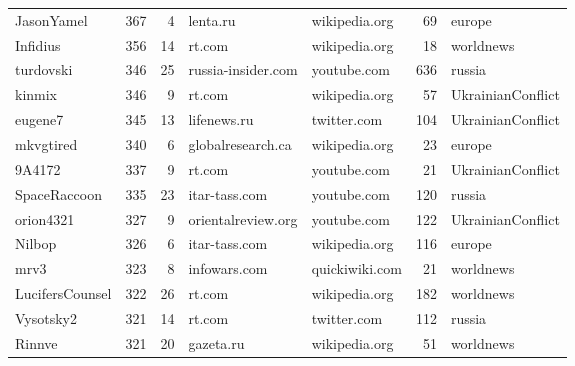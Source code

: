 \begin{tabular}{lrrllrl}
JasonYamel       &   367 &          4 &            lenta.ru &  wikipedia.org &     69 &             europe \\
Infidius         &   356 &         14 &              rt.com &  wikipedia.org &     18 &          worldnews \\
turdovski        &   346 &         25 &  russia-insider.com &    youtube.com &    636 &             russia \\
kinmix           &   346 &          9 &              rt.com &  wikipedia.org &     57 &  UkrainianConflict \\
eugene7          &   345 &         13 &         lifenews.ru &    twitter.com &    104 &  UkrainianConflict \\
mkvgtired        &   340 &          6 &   globalresearch.ca &  wikipedia.org &     23 &             europe \\
9A4172           &   337 &          9 &              rt.com &    youtube.com &     21 &  UkrainianConflict \\
SpaceRaccoon     &   335 &         23 &      itar-tass.com &    youtube.com &    120 &             russia \\
orion4321        &   327 &          9 &  orientalreview.org &    youtube.com &    122 &  UkrainianConflict \\
Nilbop           &   326 &          6 &      itar-tass.com &  wikipedia.org &    116 &             europe \\
mrv3             &   323 &          8 &        infowars.com &  quickiwiki.com &     21 &          worldnews \\
LucifersCounsel  &   322 &         26 &              rt.com &  wikipedia.org &    182 &          worldnews \\
Vysotsky2        &   321 &         14 &              rt.com &    twitter.com &    112 &             russia \\
Rinnve           &   321 &         20 &           gazeta.ru &  wikipedia.org &     51 &          worldnews \\
\bottomrule
\end{tabular}
